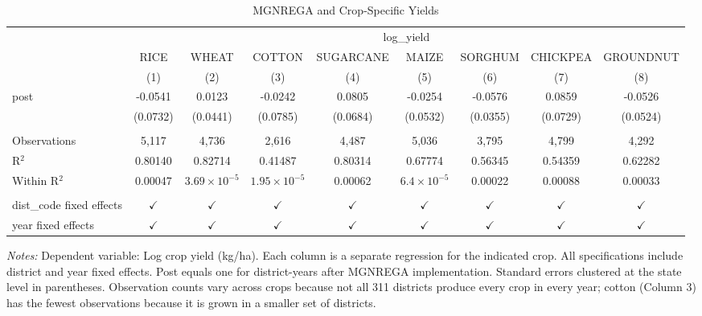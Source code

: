 
\begin{table}[htbp]
   \caption{\label{tab:main_results} MGNREGA and Crop-Specific Yields}
   \bigskip
   \centering
   \begin{adjustbox}{max width=\textwidth}
   \begin{tabular}{lcccccccc}
      \toprule
       & \multicolumn{8}{c}{log\_yield}\\
                                & RICE          & WHEAT                 & COTTON                & SUGARCANE     & MAIZE                & SORGHUM       & CHICKPEA      & GROUNDNUT \\   
                                & (1)           & (2)                   & (3)                   & (4)           & (5)                  & (6)           & (7)           & (8)\\  
      \midrule 
      post                      & -0.0541       & 0.0123                & -0.0242               & 0.0805        & -0.0254              & -0.0576       & 0.0859        & -0.0526\\   
                                & (0.0732)      & (0.0441)              & (0.0785)              & (0.0684)      & (0.0532)             & (0.0355)      & (0.0729)      & (0.0524)\\   
       \\
      Observations              & 5,117         & 4,736                 & 2,616                 & 4,487         & 5,036                & 3,795         & 4,799         & 4,292\\  
      R$^2$                     & 0.80140       & 0.82714               & 0.41487               & 0.80314       & 0.67774              & 0.56345       & 0.54359       & 0.62282\\  
      Within R$^2$              & 0.00047       & $3.69\times 10^{-5}$  & $1.95\times 10^{-5}$  & 0.00062       & $6.4\times 10^{-5}$  & 0.00022       & 0.00088       & 0.00033\\  
       \\
      dist\_code fixed effects  & $\checkmark$  & $\checkmark$          & $\checkmark$          & $\checkmark$  & $\checkmark$         & $\checkmark$  & $\checkmark$  & $\checkmark$\\   
      year fixed effects        & $\checkmark$  & $\checkmark$          & $\checkmark$          & $\checkmark$  & $\checkmark$         & $\checkmark$  & $\checkmark$  & $\checkmark$\\   
      \bottomrule
   \end{tabular}
   \end{adjustbox}

   \par \raggedright \footnotesize
   \textit{Notes:} Dependent variable: Log crop yield (kg/ha). Each column is a separate regression for the indicated crop. All specifications include district and year fixed effects. Post equals one for district-years after MGNREGA implementation. Standard errors clustered at the state level in parentheses. Observation counts vary across crops because not all 311 districts produce every crop in every year; cotton (Column 3) has the fewest observations because it is grown in a smaller set of districts.
\end{table}


